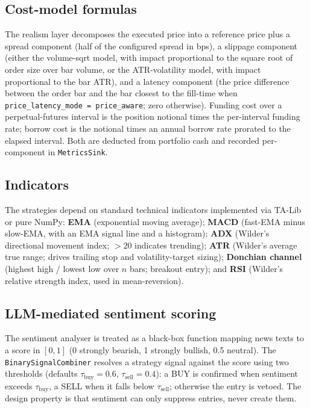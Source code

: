 \documentclass[a4paper, 12pt, titlepage]{article}
\begin{document}
\subsection{Cost-model formulas}

The realism layer decomposes the executed price into a reference
price plus a spread component (half of the configured spread in
bps), a slippage component (either the volume-sqrt model, with
impact proportional to the square root of order size over bar
volume, or the ATR-volatility model, with impact proportional to
the bar ATR), and a latency component (the price difference
between the order bar and the bar closest to the fill-time when
\texttt{price\_latency\_mode = price\_aware}; zero otherwise).
Funding cost over a perpetual-futures interval is the position
notional times the per-interval funding rate; borrow cost is the
notional times an annual borrow rate prorated to the elapsed
interval. Both are deducted from portfolio cash and recorded
per-component in \texttt{MetricsSink}.

\subsection{Indicators}

The strategies depend on standard technical indicators implemented
via TA-Lib or pure NumPy: \textbf{EMA} (exponential moving
average); \textbf{MACD} (fast-EMA minus slow-EMA, with an EMA
signal line and a histogram); \textbf{ADX} (Wilder's directional
movement index; $>\!20$ indicates trending); \textbf{ATR}
(Wilder's average true range; drives trailing stop and
volatility-target sizing); \textbf{Donchian channel} (highest
high / lowest low over $n$ bars; breakout entry); and \textbf{RSI}
(Wilder's relative strength index, used in mean-reversion).

\subsection{LLM-mediated sentiment scoring}

The sentiment analyser is treated as a black-box function mapping
news texts to a score in $[0,1]$ (0 strongly bearish, 1 strongly
bullish, 0.5 neutral). The \texttt{BinarySignalCombiner} resolves
a strategy signal against the score using two thresholds (defaults
$\tau_{\text{buy}}=0.6$, $\tau_{\text{sell}}=0.4$): a BUY is
confirmed when sentiment exceeds $\tau_{\text{buy}}$, a SELL when
it falls below $\tau_{\text{sell}}$; otherwise the entry is
vetoed. The design property is that sentiment can only suppress
entries, never create them.
\end{document}
